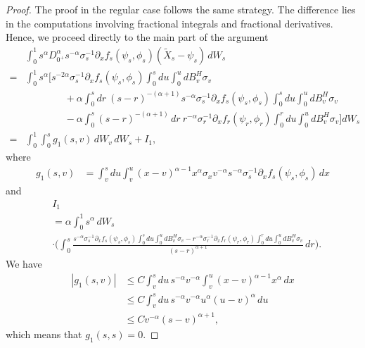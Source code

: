 \documentclass{article}
\theoremstyle{definition}  %
\theoremstyle{plain}  %
\begin{document}
\begin{proof}
  The proof in the regular case follows the same strategy.  The  difference lies in the computations involving fractional integrals and fractional derivatives. Hence, we proceed directly to the main part of the argument
\begin{align*}
&\int_0^1 s^{\alpha}D^\alpha_{0^+} s^{-\alpha} \sigma_s^{-1} \partial_x f_s(\psi_s, \phi_s)(\tilde{X}_s - \psi_s) \, dW_s\\
    =& \int_0^1 s^\alpha \Bigg[ s^{-2\alpha} \sigma_s^{-1} \partial_x f_s(\psi_s, \phi_s) \int_0^s du \int_0^u dB^H_v \sigma_v \\
    &\qquad\qquad + \alpha \int_0^s dr\ (s - r)^{-(\alpha + 1)} s^{-\alpha} \sigma_s^{-1} \partial_x f_s(\psi_s, \phi_s) \int_0^s du \int_0^u dB^H_v \sigma_v  \\
     &\qquad\qquad - \alpha \int_0^s (s - r)^{-(\alpha + 1)} \, dr\ r^{-\alpha} \sigma_r^{-1} \partial_x f_r(\psi_r, \phi_r) \int_0^r du \int_0^u dB^H_v \sigma_v  \Bigg] dW_s \\
    =& \int_0^1 \int_0^s g_1(s,v) \, dW_v \, dW_s + I_1,
\end{align*}
where
\begin{align*}
    g_1(s,v) &= \int_v^s du \int_v^u (x-v)^{\alpha-1} x^\alpha \sigma_x v^{-\alpha} s^{-\alpha} \sigma_s^{-1} \partial_x f_s(\psi_s, \phi_s) \, dx
\end{align*}
and
\begin{align*}
      &I_1\\
      &= \alpha \int_0^1 s^\alpha \, dW_s \\
    &\cdot\Bigg( \int_0^s \frac{s^{-\alpha} \sigma_s^{-1} \partial_x f_s(\psi_s, \phi_s) \int_0^s du \int_0^u dB^H_v \sigma_v - r^{-\alpha} \sigma_r^{-1} \partial_x f_r(\psi_r, \phi_r) \int_0^r du \int_0^u dB^H_v \sigma_v}{(s - r)^{\alpha + 1}} \, dr\Bigg).
\end{align*}
We have
\begin{align*}
    |g_1(s,v)| &\leq C \int_v^s du \, s^{-\alpha} v^{-\alpha} \int_v^u (x-v)^{\alpha-1} x^\alpha \, dx \\
    &\leq C \int_v^s du \, s^{-\alpha} v^{-\alpha} u^\alpha (u-v)^\alpha \, du \\
    &\leq C v^{-\alpha} (s-v)^{\alpha+1},
\end{align*}
which means that \( g_1(s,s) = 0 \).


\end{proof}
\end{document}
